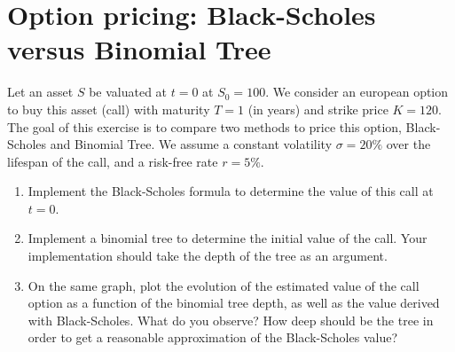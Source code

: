 \section*{Option pricing: Black-Scholes versus Binomial Tree}

Let an asset $S$ be valuated at $t=0$ at $S_0=100$. We consider an european option to buy this asset (call) with maturity $T = 1$ (in years) and strike price $K = 120$. The goal of this exercise is to compare two methods to price this option, Black-Scholes and Binomial Tree. We assume a constant volatility $\sigma=20\%$ over the lifespan of the call, and a risk-free rate $r=5\%$. 

\begin{enumerate}
    \item Implement the Black-Scholes formula to determine the value of this call at $t=0$.
    \item Implement a binomial tree to determine the initial value of the call. Your implementation should take the depth of the tree as an argument.
    \item On the same graph, plot the evolution of the estimated value of the call option as a function of the binomial tree depth, as well as the value derived with Black-Scholes. What do you observe? How deep should be the tree in order to get a reasonable approximation of the Black-Scholes value?
\end{enumerate}

